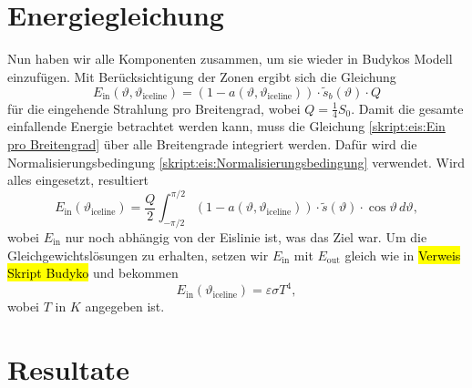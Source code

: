 \begin{refsection}
\section{Energiegleichung}
Nun haben wir alle Komponenten zusammen, um sie wieder in Budykos Modell einzufügen. Mit Berücksichtigung der Zonen ergibt sich die Gleichung
\begin{equation}\label{skript:eis:Ein pro Breitengrad}
E_\text{in}(\vartheta,\vartheta_\text{iceline})
=
(1-a(\vartheta,\vartheta_\text{iceline}))\cdot\tilde{s}_{b}(\vartheta)\cdot Q
\end{equation}
für die eingehende Strahlung pro Breitengrad, wobei $Q=\tfrac{1}{4}S_{0}$. Damit die gesamte einfallende Energie betrachtet werden kann, muss die Gleichung \eqref{skript:eis:Ein pro Breitengrad} über alle Breitengrade integriert werden. Dafür wird die Normalisierungsbedingung \eqref{skript:eis:Normalisierungsbedingung} verwendet. Wird alles eingesetzt, resultiert
\begin{equation}\label{skript:eis:Ein abh ice line}
E_\text{in}(\vartheta_\text{iceline})
=
\frac{Q}{2}\int_{-\pi/2}^{\pi/2}(1-a(\vartheta,\vartheta_\text{iceline}))\cdot\tilde{s}(\vartheta)\cdot\cos\vartheta\,d\vartheta,
\end{equation}
wobei $E_\text{in}$ nur noch abhängig von der Eislinie ist, was das Ziel war.
Um die Gleichgewichtslösungen zu erhalten, setzen wir $E_\text{in}$ mit $E_\text{out}$ gleich wie in \hl{Verweis Skript Budyko} und bekommen
\begin{equation}\label{skript:eis:Gleichgewichtsgleichung}
	E_\text{in}(\vartheta_\text{iceline})
	=
	\varepsilon\sigma T^4,
\end{equation}
wobei $T$ in $K$ angegeben ist.
\section{Resultate} \label{skript:eis:Resultate}

\end{refsection}
